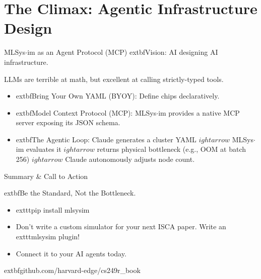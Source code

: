 \documentclass[aspectratio=169, 10pt]{beamer}
\begin{document}
\section{The Climax: Agentic Infrastructure Design}

\begin{frame}{MLSys$\cdot$im as an Agent Protocol (MCP)}
    	extbf{Vision:} AI designing AI infrastructure.
    \vspace{0.3cm}
    
    LLMs are terrible at math, but excellent at calling strictly-typed tools.
    \begin{itemize}
        \item 	extbf{Bring Your Own YAML (BYOY):} Define chips declaratively.
        \item 	extbf{Model Context Protocol (MCP):} MLSys$\cdot$im provides a native MCP server exposing its JSON schema.
        \item 	extbf{The Agentic Loop:} Claude generates a cluster YAML $
ightarrow$ MLSys$\cdot$im evaluates it $
ightarrow$ returns physical bottleneck (e.g., OOM at batch 256) $
ightarrow$ Claude autonomously adjusts node count.
    \end{itemize}
\end{frame}

\begin{frame}{Summary \& Call to Action}
    \begin{center}
        \Large 	extbf{Be the Standard, Not the Bottleneck.}
    \end{center}
    
    \vspace{0.5cm}
    \begin{itemize}
        \item 	exttt{pip install mlsysim}
        \item Don't write a custom simulator for your next ISCA paper. Write an 	exttt{mlsysim} plugin!
        \item Connect it to your AI agents today.
    \end{itemize}
    \vspace{0.5cm}
    \centering
    	extbf{github.com/harvard-edge/cs249r\_book}
\end{frame}
\end{document}
